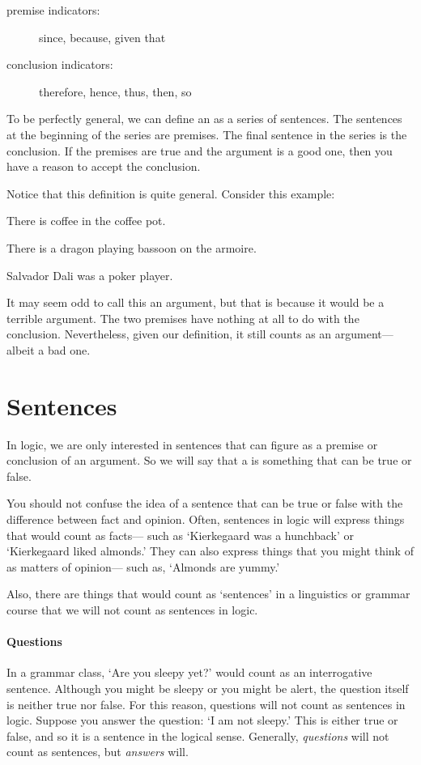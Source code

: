 \begin{description}
\item[premise indicators:] since, because, given that
\item[conclusion indicators:] therefore, hence, thus, then, so
\end{description}



To be perfectly general, we can define an  as a series of sentences. The sentences at the beginning of the series are premises. The final sentence in the series is the conclusion. If the premises are true and the argument is a good one, then you have a reason to accept the conclusion.

Notice that this definition is quite general. Consider this example:
\begin{earg}
\item[] There is coffee in the coffee pot.
\item[] There is a dragon playing bassoon on the armoire.
\item[\therefore] Salvador Dali was a poker player.
\end{earg}
It may seem odd to call this an argument, but that is because it would be a {terrible} argument. The two premises have nothing at all to do with the conclusion. Nevertheless, given our definition, it still counts as an argument--- albeit a bad one.


\section{Sentences}
\label{intro.sentences}
In logic, we are only interested in sentences that can figure as a premise or conclusion of an argument. So we will say that a  is something that can be true or false.

You should not confuse the idea of a sentence that can be true or false with the difference between fact and opinion. Often, sentences in logic will express things that would count as facts--- such as `Kierkegaard was a hunchback' or `Kierkegaard liked almonds.' They can also express things that you might think of as matters of opinion--- such as, `Almonds are yummy.'

Also, there are things that would count as `sentences' in a linguistics or grammar course that we will not count as sentences in logic.

\paragraph{Questions} In a grammar class, `Are you sleepy yet?' would count as an interrogative sentence. Although you might be sleepy or you might be alert, the question itself is neither true nor false. For this reason, questions will not count as sentences in logic. Suppose you answer the question: `I am not sleepy.' This is either true or false, and so it is a sentence in the logical sense. Generally, \emph{questions} will not count as sentences, but \emph{answers} will. 

